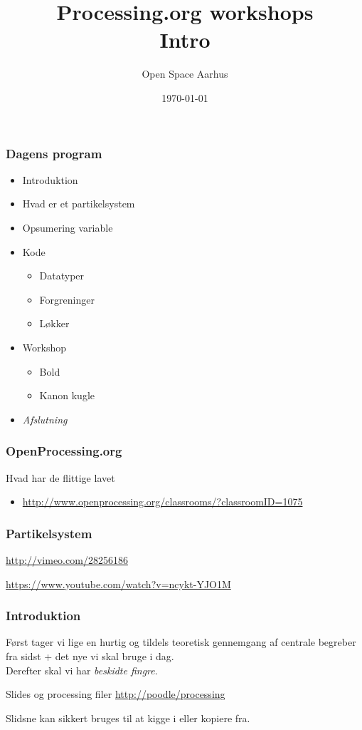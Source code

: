 \documentclass{beamer}
\title{Processing.org workshops\\Intro}
\author{Open Space Aarhus}
\date{\today}
\institute[Bryggervej 30]{Bryggervej 30, 8240 Århus N}
\begin{document}
\begin{frame}[label=titlepage]
  \titlepage
\end{frame}

\begin{frame}
  \frametitle{Dagens program}
  \begin{itemize}
  \item Introduktion
  \item Hvad er et partikelsystem
  \item Opsumering variable
  \item Kode
    \begin{itemize}
    \item Datatyper
    \item Forgreninger
    \item Løkker
    \end{itemize}

  \item Workshop
    \begin{itemize}
    \item Bold
    \item Kanon kugle
    \end{itemize}

  \item \emph{Afslutning}
    
  \end{itemize}						
\end{frame}


\begin{frame}
  \frametitle{OpenProcessing.org}
  \begin{block}{Hvad har de flittige lavet}
    \begin{itemize}
    \item \url{http://www.openprocessing.org/classrooms/?classroomID=1075}
    \end{itemize}
  \end{block}
\end{frame}



\begin{frame}
  \frametitle{Partikelsystem}

  \url{http://vimeo.com/28256186}  

  \url{https://www.youtube.com/watch?v=ncykt-YJO1M}
\end{frame}


\begin{frame}
  \frametitle{Introduktion}
  
  Først tager vi lige en hurtig og tildels teoretisk gennemgang af
  centrale begreber fra sidst + det nye vi skal bruge i dag. \\
  \vspace{1cm}
  Derefter skal vi har \emph{beskidte fingre}.

  \begin{block}{Slides og processing filer}
    \url{http://poodle/processing}   
  \end{block}
  {\tiny Slidsne kan sikkert bruges til at kigge i eller kopiere fra.}
\end{frame}
\end{document}
